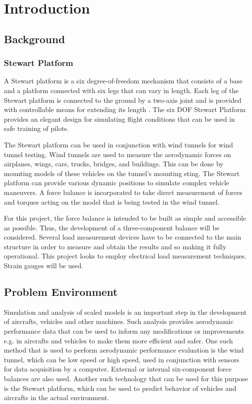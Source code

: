 \section{Introduction}
\label{sec:introduction}
\subsection{Background}
\subsubsection{Stewart Platform}
A Stewart platform is a six degree-of-freedom mechanism that consists of a base and a platform connected with six legs that can vary in length. Each leg of the Stewart platform is connected to the ground by a two-axis joint and is provided with controllable means for extending its length
\cite{wittenburg2016stewart}. The six DOF Stewart Platform provides an elegant design for simulating flight conditions that can be used in safe training of pilots\cite{stewart1965platform}. 

The Stewart platform can be used in conjunction with wind tunnels for wind tunnel testing. Wind tunnels are used to measure the aerodynamic forces on airplanes, wings, cars, trucks, bridges, and buildings. This can be done by mounting models of these vehicles on the tunnel's mounting sting. The Stewart platform can provide various dynamic positions to simulate complex vehicle maneuvers. A force balance is incorporated to take direct measurement of forces and torques acting on the model that is being tested in the wind tunnel.

For this project, the force balance is intended to be built as simple and accessible as possible. Thus, the development of a three-component balance will be considered. Several load measurement devices have to be connected to the main structure in order to measure and obtain the results and so making it fully operational. This project looks to employ electrical load measurement techniques. Strain gauges will be used.

\subsection{Problem Environment}
Simulation and analysis of scaled models is an important step in the development of aircrafts, vehicles and other machines. Such analysis provides aerodynamic performance data that can be used to inform any modifications or improvements e.g. in aircrafts and vehicles to make them more efficient and safer. One such method that is used to perform aerodynamic performance evaluation is the wind tunnel, which can be low speed or high speed, used in conjunction with sensors for data acquisition by a computer. External or internal six-component force balances are also used. Another such technology that can be used for this purpose is the Stewart platform, which can be used to predict behavior of vehicles and aircrafts in the actual environment.

